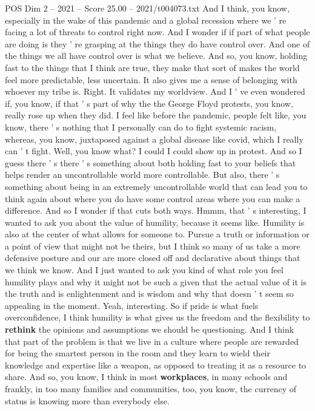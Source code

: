\begin{textsample}{POS Dim 2 – 2021 – Score 25.00 – 2021/t004073.txt}
And I think, you know, especially in the wake of this pandemic and a global recession where we ' re facing a lot of threats to control right now.
And I wonder if if part of what people are doing is they ' re grasping at the things they do have control over.
And one of the things we all have control over is what we believe.
And so, you know, holding fast to the things that I think are true, they make that sort of makes the world feel more predictable, less uncertain.
It also gives me a sense of belonging with whoever my tribe is.
Right.
It validates my worldview.
And I ' ve even wondered if, you know, if that ' s part of why the the George Floyd protests, you know, really rose up when they did.
I feel like before the pandemic, people felt like, you know, there ' s nothing that I personally can do to fight systemic racism, whereas, you know, juxtaposed against a global disease like covid, which I really can ' t fight.
Well, you know what?
I could I could show up in protest.
And so I guess there ' s there ' s something about both holding fast to your beliefs that helps render an uncontrollable world more controllable.
But also, there ' s something about being in an extremely uncontrollable world that can lead you to think again about where you do have some control areas where you can make a difference.
And so I wonder if that cuts both ways.
Hmmm, that ' s interesting, I wanted to ask you about the value of humility, because it seems like.
Humility is also at the center of what allows for someone to.
Pursue a truth or information or a point of view that might not be theirs, but I think so many of us take a more defensive posture and our are more closed off and declarative about things that we think we know.
And I just wanted to ask you kind of what role you feel humility plays and why it might not be such a given that the actual value of it is the truth and is enlightenment and is wisdom and why that doesn ' t seem so appealing in the moment.
Yeah, interesting.
So if pride is what fuels overconfidence, I think humility is what gives us the freedom and the flexibility to \textbf{rethink} the opinions and assumptions we should be questioning.
And I think that part of the problem is that we live in a culture where people are rewarded for being the smartest person in the room and they learn to wield their knowledge and expertise like a weapon, as opposed to treating it as a resource to share.
And so, you know, I think in most \textbf{workplaces}, in many schools and frankly, in too many families and communities, too, you know, the currency of status is knowing more than everybody else.

\end{textsample}
